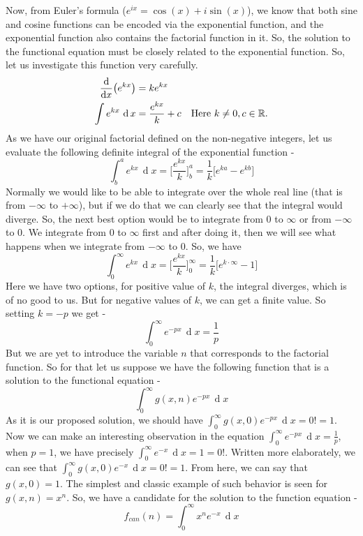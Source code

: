 Now, from Euler's formula ($e^{ix}=\cos(x)+i\sin(x)$), we know that both sine and cosine functions can be encoded via the exponential function, and the exponential function also contains the factorial function in it. So, the solution to the functional equation must be closely related to the exponential function. So, let us investigate this function very carefully.
\begin{align*}
	\dv{x}(e^{kx})&=ke^{kx}\\
	\int e^{kx}\, \operatorname{d}x&=\frac{e^{kx}}{k}+c\quad\text{Here }k\neq0,c\in\mathbb{R}.
\end{align*}
As we have our original factorial defined on the non-negative integers, let us evaluate the following definite integral of the exponential function -
$$\int_{b}^{a}e^{kx}\,\operatorname{d}x=\bigg[ \frac{e^{kx}}{k}\bigg]_{b}^{a}=\frac{1}{k}\bigg[ e^{ka} -e^{kb} \bigg] $$
Normally we would like to be able to integrate over the whole real line (that is from $-\infty$ to $+\infty$), but if we do that we can clearly see that the integral would diverge. So, the next best option would be to integrate from $0$ to $\infty$ or from $-\infty$ to $0$. We integrate from $0$ to $\infty$ first and after doing it, then we will see what happens when we integrate from $-\infty$ to $0$. So, we have $$ \int_{0}^{\infty}e^{kx}\,\operatorname{d}x=\bigg[ \frac{e^{kx}}{k}\bigg]_{0}^{\infty}=\frac{1}{k}\bigg[ e^{k\cdot\infty} - 1 \bigg] $$
Here we have two options, for positive value of $k$, the integral diverges, which is of no good to us. But for negative values of $k$, we can get a finite value. So setting $k=-p$ we get - $$ \int_{0}^{\infty}e^{-px}\,\operatorname{d}x= \frac{1}{p}$$ But we are yet to introduce the variable $n$ that corresponds to the factorial function. So for that let us suppose we have the following function that is a solution to the functional equation - $$ \int_{0}^{\infty}g(x,n)e^{-px}\, \operatorname{d}x $$ As it is our proposed solution, we should have $ \int_{0}^{\infty}g(x,0)e^{-px}\, \operatorname{d}x=0!=1 $. Now we can make an interesting observation in the equation $ \int_{0}^{\infty}e^{-px}\,\operatorname{d}x= \frac{1}{p} $, when $p=1$, we have precisely $ \int_{0}^{\infty}e^{-x}\,\operatorname{d}x= 1 = 0! $. Written more elaborately, we can see that $ \int_{0}^{\infty} g(x,0) e^{-x}\, \operatorname{d}x= 0!=1 $. From here, we can say that $g(x,0)=1$. The simplest and classic example of such behavior is seen for $g(x,n)=x^n$. So, we have a candidate for the solution to the function equation - $$ f_{can}(n)=\int_0^{\infty} x^ne^{-x}\, \operatorname{d}x $$
